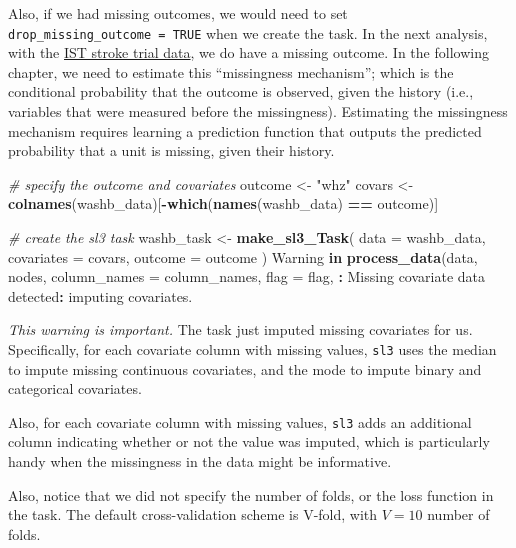 \documentclass[12pt, krantz2,]{krantz}
\newenvironment{Shaded}{\begin{snugshade}}{\end{snugshade}}
\newcommand{\CommentTok}[1]{\textcolor[rgb]{0.37,0.37,0.37}{\textit{#1}}}
\newcommand{\ControlFlowTok}[1]{\textcolor[rgb]{0.27,0.27,0.27}{\textbf{#1}}}
\newcommand{\DataTypeTok}[1]{\textcolor[rgb]{0.27,0.27,0.27}{#1}}
\newcommand{\KeywordTok}[1]{\textcolor[rgb]{0.27,0.27,0.27}{\textbf{#1}}}
\newcommand{\NormalTok}[1]{#1}
\newcommand{\OperatorTok}[1]{\textcolor[rgb]{0.43,0.43,0.43}{\textbf{#1}}}
\newcommand{\StringTok}[1]{\textcolor[rgb]{0.5,0.5,0.5}{#1}}
\theoremstyle{definition}
\theoremstyle{definition}
\theoremstyle{definition}
\newcommand{\1}{\mathbbm{1}}
\begin{document}
Also, if we had missing outcomes, we would need to set \texttt{drop\_missing\_outcome\ =\ TRUE} when we create the task. In the next analysis, with the \protect\hyperlink{ist}{IST stroke trial
data}, we do have a missing outcome. In the following chapter, we need to
estimate this ``missingness mechanism''; which is the conditional probability that
the outcome is observed, given the history (i.e., variables that were measured
before the missingness). Estimating the missingness mechanism requires learning
a prediction function that outputs the predicted probability that a unit is
missing, given their history.

\begin{Shaded}
\begin{Highlighting}[]
\CommentTok{# specify the outcome and covariates}
\NormalTok{outcome <-}\StringTok{ "whz"}
\NormalTok{covars <-}\StringTok{ }\KeywordTok{colnames}\NormalTok{(washb_data)[}\OperatorTok{-}\KeywordTok{which}\NormalTok{(}\KeywordTok{names}\NormalTok{(washb_data) }\OperatorTok{==}\StringTok{ }\NormalTok{outcome)]}

\CommentTok{# create the sl3 task}
\NormalTok{washb_task <-}\StringTok{ }\KeywordTok{make_sl3_Task}\NormalTok{(}
  \DataTypeTok{data =}\NormalTok{ washb_data,}
  \DataTypeTok{covariates =}\NormalTok{ covars,}
  \DataTypeTok{outcome =}\NormalTok{ outcome}
\NormalTok{)}
\NormalTok{Warning }\ControlFlowTok{in} \KeywordTok{process_data}\NormalTok{(data, nodes, }\DataTypeTok{column_names =}\NormalTok{ column_names, }\DataTypeTok{flag =}\NormalTok{ flag, }\OperatorTok{:}
\NormalTok{Missing covariate data detected}\OperatorTok{:}\StringTok{ }\NormalTok{imputing covariates.}
\end{Highlighting}
\end{Shaded}

\emph{This warning is important.} The task just imputed missing covariates for us.
Specifically, for each covariate column with missing values, \texttt{sl3} uses the
median to impute missing continuous covariates, and the mode to impute binary
and categorical covariates.

Also, for each covariate column with missing values, \texttt{sl3} adds an additional
column indicating whether or not the value was imputed, which is particularly
handy when the missingness in the data might be informative.

Also, notice that we did not specify the number of folds, or the loss function
in the task. The default cross-validation scheme is V-fold, with \(V=10\) number
of folds.
\end{document}
